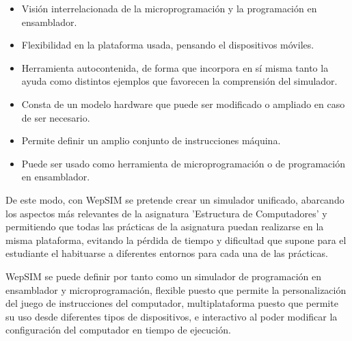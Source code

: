 \begin{itemize}
	\item Visión interrelacionada de la microprogramación y la programación en ensamblador.
	\item Flexibilidad en la plataforma usada, pensando el dispositivos móviles.
	\item Herramienta autocontenida, de forma que incorpora en sí misma tanto la ayuda como distintos ejemplos que favorecen la comprensión del simulador.
	\item Consta de un modelo hardware que puede ser modificado o ampliado en caso de ser necesario.
	\item Permite definir un amplio conjunto de instrucciones máquina.
	\item Puede ser usado como herramienta de microprogramación o de programación en ensamblador.
\end{itemize}

\begin{table}[htbp]
\centering
\caption{Comparación de simuladores de ensamblador y microcódigo.}
\label{tab:comparison_frameworks}
\end{table}

De este modo, con WepSIM se pretende crear un simulador unificado, abarcando los aspectos más relevantes de la asignatura 'Estructura de Computadores' y permitiendo que todas las prácticas de la asignatura puedan realizarse en la misma plataforma, evitando la pérdida de tiempo y dificultad que supone para el estudiante el habituarse a diferentes entornos para cada una de las prácticas.

WepSIM se puede definir por tanto como un simulador de programación en ensamblador y microprogramación, flexible puesto que permite la personalización del juego de instrucciones del computador, multiplataforma puesto que permite su uso desde diferentes tipos de dispositivos, e interactivo al poder modificar la configuración del computador en tiempo de ejecución.


